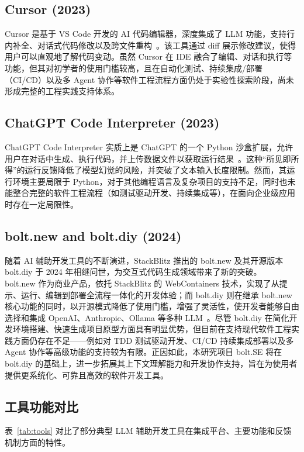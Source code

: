 \subsection{Cursor (2023)}
Cursor 是基于 VS Code 开发的 AI 代码编辑器，深度集成了 LLM 功能，支持行内补全、对话式代码修改以及跨文件重构~\cite{CursorReview}。该工具通过 diff 展示修改建议，使得用户可以直观地了解代码变动。虽然 Cursor 在 IDE 融合了编辑、对话和执行等功能，但其对初学者的使用门槛较高，且在自动化测试、持续集成/部署（CI/CD）以及多 Agent 协作等软件工程流程方面仍处于实验性探索阶段，尚未形成完整的工程实践支持体系。

\subsection{ChatGPT Code Interpreter (2023)}
ChatGPT Code Interpreter 实质上是 ChatGPT 的一个 Python 沙盒扩展，允许用户在对话中生成、执行代码，并上传数据文件以获取运行结果~\cite{FirstBlush2023}。这种“所见即所得”的运行反馈降低了模型幻觉的风险，并突破了文本输入长度限制。然而，其运行环境主要局限于 Python，对于其他编程语言及复杂项目的支持不足，同时也未能整合完整的软件工程流程（如测试驱动开发、持续集成等），在面向企业级应用时存在一定局限性。

\subsection{bolt.new and bolt.diy (2024)}
随着 AI 辅助开发工具的不断演进，StackBlitz 推出的 bolt.new 及其开源版本 bolt.diy 于 2024 年相继问世，为交互式代码生成领域带来了新的突破。\\

bolt.new 作为商业产品，依托 StackBlitz 的 WebContainers 技术，实现了从提示、运行、编辑到部署全流程一体化的开发体验；而 bolt.diy 则在继承 bolt.new 核心功能的同时，以开源模式降低了使用门槛，增强了灵活性，使开发者能够自由选择和集成 OpenAI、Anthropic、Ollama 等多种 LLM~\cite{BoltNew2024, BoltDIY2024}。尽管 bolt.diy 在简化开发环境搭建、快速生成项目原型方面具有明显优势，但目前在支持现代软件工程实践方面仍存在不足——例如对 TDD 测试驱动开发、CI/CD 持续集成部署以及多 Agent 协作等高级功能的支持较为有限。正因如此，本研究项目 bolt.SE 将在 bolt.diy 的基础上，进一步拓展其上下文理解能力和开发协作支持，旨在为使用者提供更系统化、可靠且高效的软件开发工具。

\subsection{工具功能对比}
表~\ref{tab:tools} 对比了部分典型 LLM 辅助开发工具在集成平台、主要功能和反馈机制方面的特性。

